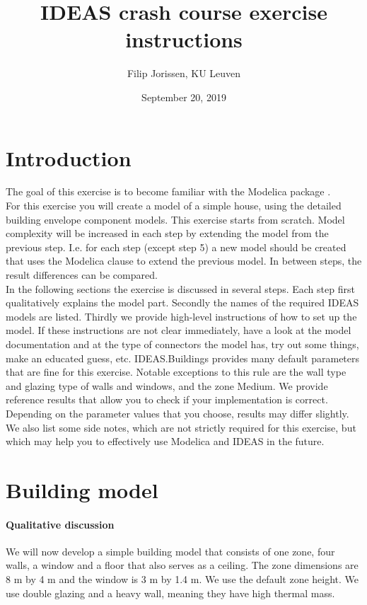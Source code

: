 \documentclass[10pt,a4paper]{article}
\begin{document}
\title{IDEAS crash course exercise instructions}
\author{Filip Jorissen, KU Leuven}
\date{September 20, 2019}
\maketitle

\section*{Introduction}
The goal of this exercise is to become familiar with the 
Modelica package . \\

For this exercise you will create a model of a simple house,
using the detailed building envelope component models.
This exercise starts from scratch. 
Model complexity will be increased in each step by 
extending the model from the previous step. 
I.e. for each step (except step 5) a new model should be created that uses
the Modelica  clause to extend the previous model.
In between steps, the result differences can be compared.\\


In the following sections the exercise is discussed 
in several steps. 
Each step first qualitatively explains the model part.
Secondly the names of the required IDEAS models 
are listed.
Thirdly we provide high-level instructions of how to
set up the model.
If these instructions are not clear immediately, 
have a look at the model documentation and at the type of
connectors the model has, 
try out some things, 
make an educated guess, etc.
IDEAS.Buildings provides many default parameters that are fine for
this exercise. Notable exceptions to this rule are
the wall type and glazing type of walls and windows, and the zone Medium.
We provide reference results that allow you to check
if your implementation is correct. 
Depending on the parameter values that you choose, results
may differ slightly.
We also list some side notes, which are not strictly required for this
exercise, but which may help you to effectively use Modelica
and IDEAS in the future.

\section{Building  model}
\paragraph{Qualitative discussion}
We will now develop a simple building model that consists of one zone,
four walls, a window and a floor that also serves as a ceiling.
The zone dimensions are 8 m by 4 m and the window is 3 m by 1.4 m. We use the default zone height.
We use double glazing and a heavy wall, meaning they
have high thermal mass.
\end{document}
